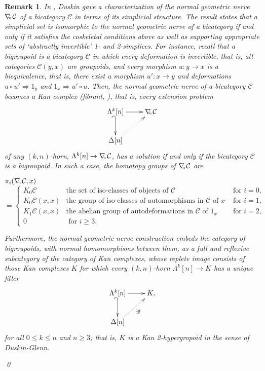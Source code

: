 \documentclass[]{amsart}
\newtheorem{remark}[theorem]{Remark}
\begin{document}
\begin{remark}{\em In \cite{duskin}, Duskin gave  a characterization of the normal geometric nerve $\nabla\hspace{-2.5pt}_{^{_\mathrm{u}}}{\ensuremath{\mathcal{C}}}$ of a bicategory ${\ensuremath{\mathcal{C}}}$ in terms of its simplicial structure. The result states that a simplicial set is  isomorphic to the normal geometric nerve of a bicategory if and only if it satisfies the coskeletal conditions above as well as supporting appropriate sets of `abstractly invertible' 1- and 2-simplices. For  instance, recall that a {\em bigroupoid} is a bicategory ${\ensuremath{\mathcal{C}}}$ in which every deformation is invertible, that is, all categories ${\ensuremath{\mathcal{C}}}(y,x)$ are groupoids, and every morphism $u:y\to x$ is a biequivalence, that is,  there exist  a morphism $u':x\to y$ and deformations $u\circ u'\Rightarrow 1_y$ and $1_x\Rightarrow u'\circ u$. Then, the normal geometric nerve of a bicategory ${\ensuremath{\mathcal{C}}}$ becomes a Kan complex \cite{may} (fibrant, \cite{g-j}), that is, every extension problem $$\xymatrix{\Lambda^k[n]\ar[r]\ar@{_{(}->}[d]&\nabla\hspace{-2.5pt}_{^{_\mathrm{u}}}{\ensuremath{\mathcal{C}}}\\
\Delta[n]\ar@{..>}[ru]&}$$ of any $(k,n)$-horn, $\Lambda^k[n]\to
\nabla\hspace{-2.5pt}_{^{_\mathrm{u}}}{\ensuremath{\mathcal{C}}}$,  has a solution if and only if the bicategory ${\ensuremath{\mathcal{C}}}$ is a
bigroupoid. In such a case, the homotopy groups of $\nabla\hspace{-2.5pt}_{^{_\mathrm{u}}}{\ensuremath{\mathcal{C}}}$ are

\vspace{0.2cm}
$\pi_i(\nabla\hspace{-2.5pt}_{^{_\mathrm{u}}}{\ensuremath{\mathcal{C}}},x)$ $$=\left\{\begin{array}{lll}K_0{\ensuremath{\mathcal{C}}}&\text{the set of iso-classes of objects of } {\ensuremath{\mathcal{C}}}& \text{ for }i=0,\\
 K_0{\ensuremath{\mathcal{C}}}(x,x)&\text{the group of iso-classes of automorphisms in ${\ensuremath{\mathcal{C}}}$ of } x&\text{ for } i=1,\\K_1{\ensuremath{\mathcal{C}}}(x,x)&\text{the abelian group of autodeformations in ${\ensuremath{\mathcal{C}}}$ of } 1_x &\text{ for }i=2,\\
 0&\text{ for }i\geq 3.\end{array}\right.$$

Furthermore, the normal geometric nerve construction embeds the category of bigroupoids, with
normal homomorphisms between them, as a full and reflexive subcategory of the category of Kan
complexes, whose replete image consists of those Kan complexes $K$ for which every $(k,n)$-horn
$\Lambda^k[n]\to K$ has a unique filler
$$\xymatrix{\Lambda^k[n]\ar[r]\ar@{_{(}->}[d]&K,\\
\Delta[n]\ar@{..>}[ru]_{\exists !}&}$$ for all $0\leq k\leq n$ and $n\geq 3$; that is, $K$ is a Kan
2-{\em hypergropoid} in the sense of Duskin-Glenn. }\qed
\end{remark}
\end{document}
